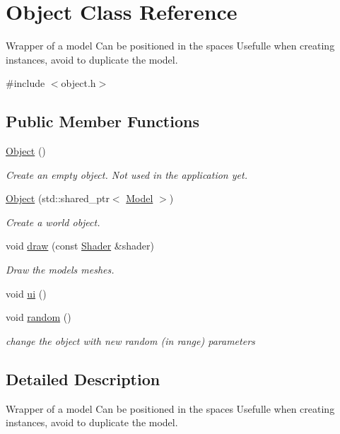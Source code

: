 \hypertarget{classObject}{}\section{Object Class Reference}
\label{classObject}


Wrapper of a model Can be positioned in the spaces Usefulle when creating instances, avoid to duplicate the model.  




{\ttfamily \#include $<$object.\+h$>$}

\subsection*{Public Member Functions}
\begin{DoxyCompactItemize}
\item 
\hyperlink{classObject_a40860402e64d8008fb42329df7097cdb}{Object} ()
\begin{DoxyCompactList}\small\item\em Create an empty object. Not used in the application yet. \end{DoxyCompactList}\item 
\hyperlink{classObject_a30ff0733f6b70bc1037d58b927237a0c}{Object} (std\+::shared\+\_\+ptr$<$ \hyperlink{classModel}{Model} $>$)
\begin{DoxyCompactList}\small\item\em Create a world object. \end{DoxyCompactList}\item 
void \hyperlink{classObject_ad9684af664b6b318174bb147d88131fe}{draw} (const \hyperlink{classShader}{Shader} \&shader)
\begin{DoxyCompactList}\small\item\em Draw the model\textquotesingle{}s meshes. \end{DoxyCompactList}\item 
void \hyperlink{classObject_a0a9d6c7d2325fc1eb7e5854151a51d09}{ui} ()
\item 
void \hyperlink{classObject_ac28acd7323fc00d2522b22b19a10a7d6}{random} ()
\begin{DoxyCompactList}\small\item\em change the object with new random (in range) parameters \end{DoxyCompactList}\end{DoxyCompactItemize}


\subsection{Detailed Description}
Wrapper of a model Can be positioned in the spaces Usefulle when creating instances, avoid to duplicate the model. 


